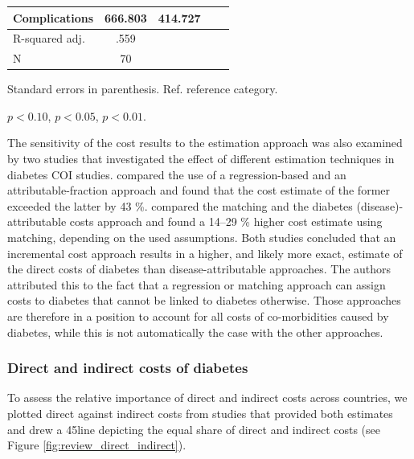 \begin{table}[p]
\begin{center}
\begin{adjustbox}{max width=\linewidth}
\begin{threeparttable}
{\begin{tabular}{l*{2}{SS}}
                Complications & 666.803 & 414.727 \\
\midrule
                R-squared adj. & .559 &  \\
                N & 70 &  \\ 
 \bottomrule
\end{tabular}
\begin{tablenotes}
\item Standard errors in parenthesis. Ref. reference category.
\item \sym{*} \(p<0.10\), \sym{**} \(p<0.05\), \sym{***} \(p<0.01\).
\end{tablenotes}
}
\end{threeparttable}
\end{adjustbox}
\end{center}
\end{table}

The sensitivity of the cost results to the estimation approach was also examined by two studies that investigated the effect of different estimation techniques in diabetes \ac{COI} studies. \textcite{Honeycutt2009a} compared the use of a regression-based and an attributable-fraction approach and found that the cost estimate of the former exceeded the latter by 43 \%. \textcite{Tunceli2010c} compared the matching and the diabetes (disease)-attributable costs approach and found a 14--29 \% higher cost estimate using matching, depending on the used assumptions. Both studies concluded that an incremental cost approach results in a higher, and likely more exact, estimate of the direct costs of diabetes than disease-attributable approaches. The authors attributed this to the fact that a regression or matching approach can assign costs to diabetes that cannot be linked to diabetes otherwise. Those approaches are therefore in a position to account for all costs of co-morbidities caused by diabetes, while this is not automatically the case with the other approaches.

\subsubsection*{Direct and indirect costs of diabetes}

To assess the relative importance of direct and indirect costs across countries, we plotted direct against indirect costs from studies that provided both estimates and drew a 45\degree line depicting the equal share of direct and indirect costs (see Figure \ref{fig:review_direct_indirect}).

